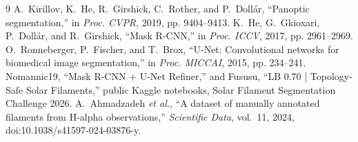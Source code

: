 \begin{thebibliography}{9}
A.~Kirillov, K.~He, R.~Girshick, C.~Rother, and P.~Doll\'ar, ``Panoptic segmentation,'' in
\emph{Proc. CVPR}, 2019, pp. 9404--9413.
K.~He, G.~Gkioxari, P.~Doll\'ar, and R.~Girshick, ``Mask R-CNN,'' in \emph{Proc. ICCV}, 2017,
pp. 2961--2969.
O.~Ronneberger, P.~Fischer, and T.~Brox, ``U-Net: Convolutional networks for biomedical image
segmentation,'' in \emph{Proc. MICCAI}, 2015, pp. 234--241.
Nomannic19, ``Mask R-CNN + U-Net Refiner,'' and Fususu, ``LB 0.70 | Topology-Safe Solar
Filaments,'' public Kaggle notebooks, Solar Filament Segmentation Challenge 2026.
A.~Ahmadzadeh \emph{et al.}, ``A dataset of manually annotated filaments from H-alpha
observations,'' \emph{Scientific Data}, vol.~11, 2024, doi:10.1038/s41597-024-03876-y.
\end{thebibliography}


